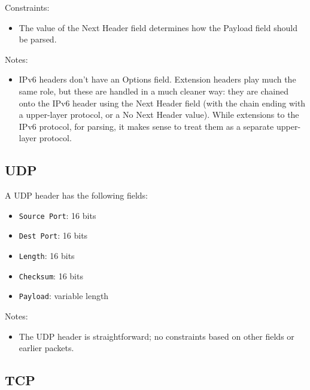 \documentclass[10pt,a4paper]{article}
\begin{document}
Constraints:
\begin{itemize}
\item The value of the Next Header field determines how the Payload field should be parsed.
\end{itemize}

Notes:
\begin{itemize}
\item IPv6 headers don't have an Options field. Extension headers play much the same role,
but these are handled in a much cleaner way: they are chained onto the IPv6 header using
the Next Header field (with the chain ending with a upper-layer protocol, or a No Next
Header value). While extensions to the IPv6 protocol, for parsing, it makes sense to treat
them as a separate upper-layer protocol.
\end{itemize}

\subsection{UDP}

A UDP header has the following fields:
\begin{itemize}
\item \texttt{Source Port}: 16 bits
\item \texttt{Dest Port}: 16 bits
\item \texttt{Length}: 16 bits
\item \texttt{Checksum}: 16 bits
\item \texttt{Payload}: variable length
\end{itemize}

Notes:
\begin{itemize}
\item The UDP header is straightforward; no constraints based on other fields or earlier packets.
\end{itemize}

\subsection{TCP}
\end{document}
